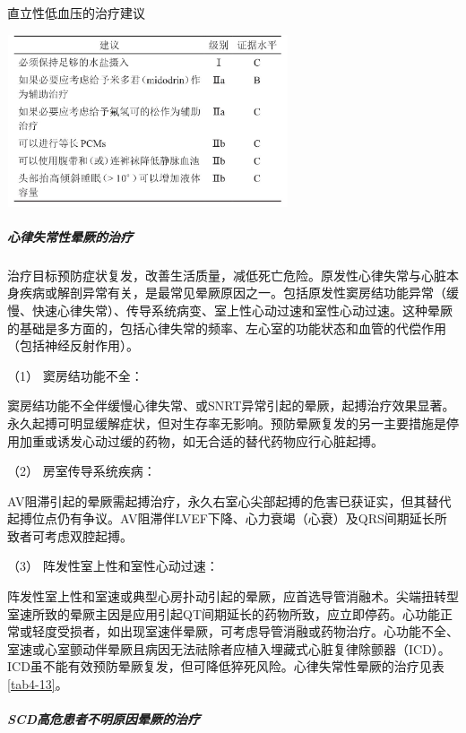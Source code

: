 \begin{table}[htbp]
\centering
\caption{直立性低血压的治疗建议}
\label{tab4-12}
\includegraphics[width=3.27083in,height=2in]{./images/Image00030.jpg}
\end{table}

\subparagraph{心律失常性晕厥的治疗}

治疗目标预防症状复发，改善生活质量，减低死亡危险。原发性心律失常与心脏本身疾病或解剖异常有关，是最常见晕厥原因之一。包括原发性窦房结功能异常（缓慢、快速心律失常）、传导系统病变、室上性心动过速和室性心动过速。这种晕厥的基础是多方面的，包括心律失常的频率、左心室的功能状态和血管的代偿作用（包括神经反射作用）。

\hypertarget{text00014.htmlux5cux23CHP1-4-4-1-3-1}{}
（1） 窦房结功能不全：

窦房结功能不全伴缓慢心律失常、或SNRT异常引起的晕厥，起搏治疗效果显著。永久起搏可明显缓解症状，但对生存率无影响。预防晕厥复发的另一主要措施是停用加重或诱发心动过缓的药物，如无合适的替代药物应行心脏起搏。

\hypertarget{text00014.htmlux5cux23CHP1-4-4-1-3-2}{}
（2） 房室传导系统疾病：

AV阻滞引起的晕厥需起搏治疗，永久右室心尖部起搏的危害已获证实，但其替代起搏位点仍有争议。AV阻滞伴LVEF下降、心力衰竭（心衰）及QRS间期延长所致者可考虑双腔起搏。

\hypertarget{text00014.htmlux5cux23CHP1-4-4-1-3-3}{}
（3） 阵发性室上性和室性心动过速：

阵发性室上性和室速或典型心房扑动引起的晕厥，应首选导管消融术。尖端扭转型室速所致的晕厥主因是应用引起QT间期延长的药物所致，应立即停药。心功能正常或轻度受损者，如出现室速伴晕厥，可考虑导管消融或药物治疗。心功能不全、室速或心室颤动伴晕厥且病因无法祛除者应植入埋藏式心脏复律除颤器（ICD）。ICD虽不能有效预防晕厥复发，但可降低猝死风险。心律失常性晕厥的治疗见表\ref{tab4-13}。

\subparagraph{SCD高危患者不明原因晕厥的治疗}

